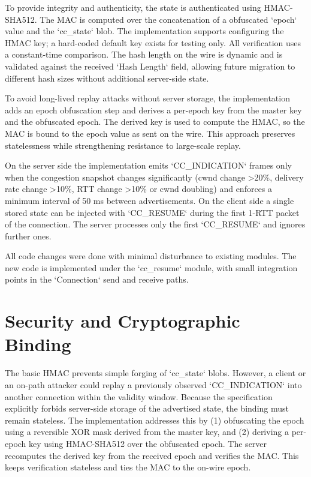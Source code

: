\documentclass[11pt, a4paper,titlepage]{report}
\begin{document}
To provide integrity and authenticity, the state is authenticated using
HMAC-SHA512. The MAC is computed over the concatenation of a obfuscated `epoch`
value and the `cc_state` blob. The implementation supports configuring the
HMAC key; a hard-coded default key exists for testing only. All verification
uses a constant-time comparison. The hash length on the wire is dynamic and is
validated against the received `Hash Length` field, allowing future migration
to different hash sizes without additional server-side state.

To avoid long-lived replay attacks without server storage, the implementation
adds an epoch obfuscation step and derives a per-epoch key from the master key
and the obfuscated epoch. The derived key is used to compute the HMAC, so the
MAC is bound to the epoch value as sent on the wire. This approach preserves
statelessness while strengthening resistance to large-scale replay.

On the server side the implementation emits `CC_INDICATION` frames only when
the congestion snapshot changes significantly (cwnd change >20\%, delivery rate
change >10\%, RTT change >10\% or cwnd doubling) and enforces a minimum
interval of 50 ms between advertisements. On the client side a single stored
state can be injected with `CC_RESUME` during the first 1-RTT packet of the
connection. The server processes only the first `CC_RESUME` and ignores further
ones.

All code changes were done with minimal disturbance to existing modules. The
new code is implemented under the `cc_resume` module, with small integration
points in the `Connection` send and receive paths.

\section{Security and Cryptographic Binding}
The basic HMAC prevents simple forging of `cc_state` blobs. However, a client
or an on-path attacker could replay a previously observed `CC_INDICATION`
into another connection within the validity window. Because the specification
explicitly forbids server-side storage of the advertised state, the binding
must remain stateless. The implementation addresses this by (1) obfuscating
the epoch using a reversible XOR mask derived from the master key, and (2)
deriving a per-epoch key using HMAC-SHA512 over the obfuscated epoch. The
server recomputes the derived key from the received epoch and verifies the
MAC. This keeps verification stateless and ties the MAC to the on-wire epoch.
\end{document}
